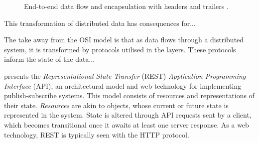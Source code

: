 \documentclass[../report.tex]{subfiles}
\begin{document}
\begin{figure}[H]
\caption{End-to-end data flow and encapsulation with headers and trailers \cite[p. 15]{alani2014guide}.}
\label{fig:dataflow}
\end{figure}

\color{red}
This transformation of distributed data has consequences for...

The take away from the OSI model is that as data flows through a distributed system, it is transformed by protocols utilised in the layers. These protocols inform the state of the data...
\color{black}


\cite{tarkoma2012publish} presents the \textit{Representational State Transfer} (REST) \textit{Application Programming Interface} (API), an architectural model and web technology for implementing publish-subscribe systems. This model consists of resources and representations of their state. \textit{Resources} are akin to objects, whose current or future state is represented in the system. State is altered through API requests sent by a client, which becomes transitional once it awaits at least one server response. As a web technology, REST is typically seen with the HTTP protocol.




\end{document}
